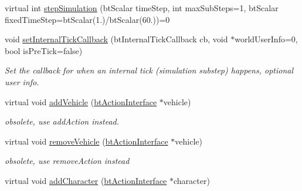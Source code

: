 \begin{CompactItemize}
\item 
virtual int \hyperlink{classbt_dynamics_world_5ab26a0d6e8b2b21fbde2ed8f8dd6294}{stepSimulation} (btScalar timeStep, int maxSubSteps=1, btScalar fixedTimeStep=btScalar(1.)/btScalar(60.))=0
\item 
\hypertarget{classbt_dynamics_world_6974c869e196322377e2d8c078db5805}{
void \hyperlink{classbt_dynamics_world_6974c869e196322377e2d8c078db5805}{setInternalTickCallback} (btInternalTickCallback cb, void $\ast$worldUserInfo=0, bool isPreTick=false)}
\label{classbt_dynamics_world_6974c869e196322377e2d8c078db5805}

\begin{CompactList}\small\item\em Set the callback for when an internal tick (simulation substep) happens, optional user info. \item\end{CompactList}\item 
\hypertarget{classbt_dynamics_world_b897455739081304249e7af787cafa19}{
virtual void \hyperlink{classbt_dynamics_world_b897455739081304249e7af787cafa19}{addVehicle} (\hyperlink{classbt_action_interface}{btActionInterface} $\ast$vehicle)}
\label{classbt_dynamics_world_b897455739081304249e7af787cafa19}

\begin{CompactList}\small\item\em obsolete, use addAction instead. \item\end{CompactList}\item 
\hypertarget{classbt_dynamics_world_bb361ed4e22766cd79d22ece3f5869e6}{
virtual void \hyperlink{classbt_dynamics_world_bb361ed4e22766cd79d22ece3f5869e6}{removeVehicle} (\hyperlink{classbt_action_interface}{btActionInterface} $\ast$vehicle)}
\label{classbt_dynamics_world_bb361ed4e22766cd79d22ece3f5869e6}

\begin{CompactList}\small\item\em obsolete, use removeAction instead \item\end{CompactList}\item 
\hypertarget{classbt_dynamics_world_56e16159fdff1311706d4b73e0999e02}{
virtual void \hyperlink{classbt_dynamics_world_56e16159fdff1311706d4b73e0999e02}{addCharacter} (\hyperlink{classbt_action_interface}{btActionInterface} $\ast$character)}
\label{classbt_dynamics_world_56e16159fdff1311706d4b73e0999e02}


\end{CompactItemize}
